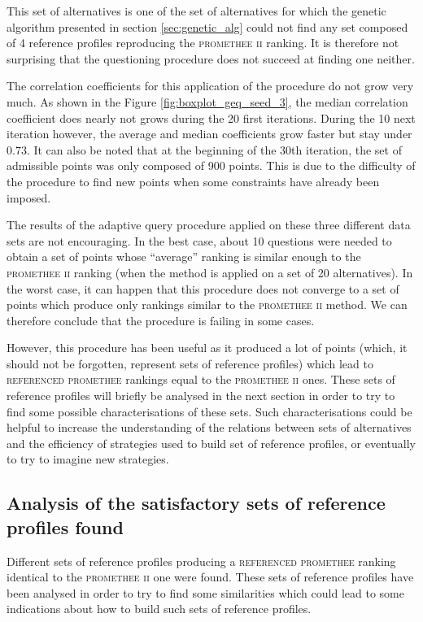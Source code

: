 This set of alternatives is one of the set of alternatives for which the genetic algorithm presented in section \ref{sec:genetic_alg} could not find any set composed of 4 reference profiles reproducing the \textsc{promethee ii} ranking.
It is therefore not surprising that the questioning procedure does not succeed at finding one neither.

The correlation coefficients for this application of the procedure do not grow very much. As shown in the Figure \ref{fig:boxplot_geq_seed_3}, the median correlation coefficient does nearly not grows during the 20 first iterations. During the 10 next iteration however, the average and median coefficients grow faster but stay under $0.73$.
It can also be noted that at the beginning of the 30th iteration, the set of admissible points was only composed of 900 points. This is due to the difficulty of the procedure to find new points when some constraints have already been imposed.

The results of the adaptive query procedure applied on these three different data sets are not encouraging.
In the best case, about 10 questions were needed to obtain a set of points whose ``average'' ranking is similar enough to the \textsc{promethee ii} ranking (when the method is applied on a set of 20 alternatives).
In the worst case, it can happen that this procedure does not converge to a set of points which produce only rankings similar to the \textsc{promethee ii} method. We can therefore conclude that the procedure is failing in some cases.

However, this procedure has been useful as it produced a lot of points (which, it should not be forgotten, represent sets of reference profiles) which lead to \textsc{referenced promethee} rankings equal to the \textsc{promethee ii} ones.
These sets of reference profiles will briefly be analysed in the next section in order to try to find some possible characterisations of these sets.
Such characterisations could be helpful to increase the understanding of the relations between sets of alternatives and the efficiency of strategies used to build set of reference profiles, or eventually to try to imagine new strategies.

\subsection{Analysis of the satisfactory sets of reference profiles found}

Different sets of reference profiles producing a \textsc{referenced promethee} ranking identical to the \textsc{promethee ii} one were found.
These sets of reference profiles have been analysed in order to try to find some similarities which could lead to some indications about how to build such sets of reference profiles.

